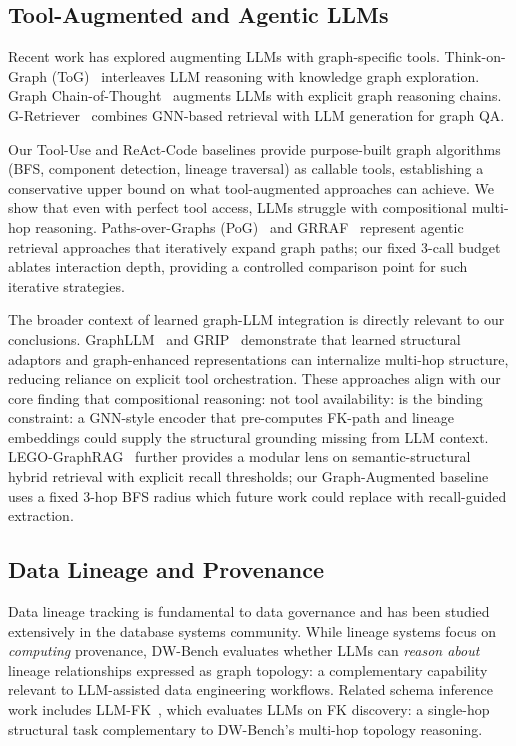 \subsection{Tool-Augmented and Agentic LLMs}

Recent work has explored augmenting LLMs with graph-specific tools.
Think-on-Graph (ToG)~\cite{sun2024tog} interleaves LLM reasoning with
knowledge graph exploration.  Graph Chain-of-Thought~\cite{jin2024graphcot}
augments LLMs with explicit graph reasoning chains.  G-Retriever~\cite{he2024gretriever}
combines GNN-based retrieval with LLM generation for graph QA.

Our Tool-Use and ReAct-Code baselines provide purpose-built graph
algorithms (BFS, component detection, lineage traversal) as callable
tools, establishing a conservative upper bound on what tool-augmented
approaches can achieve.  We show that even with perfect tool access,
LLMs struggle with compositional multi-hop reasoning.
Paths-over-Graphs (PoG)~\cite{pog2024} and GRRAF~\cite{grraf2024}
represent agentic retrieval approaches that iteratively expand graph
paths; our fixed 3-call budget ablates interaction depth, providing
a controlled comparison point for such iterative strategies.

The broader context of learned graph-LLM integration is directly
relevant to our conclusions.  GraphLLM~\cite{graphllm2023} and
GRIP~\cite{grip2024} demonstrate that learned structural adaptors
and graph-enhanced representations can internalize multi-hop structure,
reducing reliance on explicit tool orchestration.  These approaches
align with our core finding that compositional reasoning: not tool
availability: is the binding constraint: a GNN-style encoder that
pre-computes FK-path and lineage embeddings could supply the structural
grounding missing from LLM context.  LEGO-GraphRAG~\cite{legographrag2024}
further provides a modular lens on semantic-structural hybrid retrieval
with explicit recall thresholds; our Graph-Augmented baseline uses a
fixed 3-hop BFS radius which future work could replace with
recall-guided extraction.

\subsection{Data Lineage and Provenance}

Data lineage tracking is fundamental to data governance and has been
studied extensively in the database systems community.  While lineage
systems focus on \emph{computing} provenance, DW-Bench evaluates whether
LLMs can \emph{reason about} lineage relationships expressed as graph
topology: a complementary capability relevant to LLM-assisted data
engineering workflows.  Related schema inference work includes
LLM-FK~\cite{tang2026llmfk}, which evaluates LLMs on FK discovery: a
single-hop structural task complementary to DW-Bench's multi-hop
topology reasoning.

